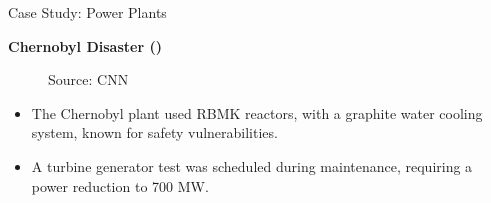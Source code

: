 \documentclass[11pt]{beamer}
\begin{document}
\begin{frame}[t,allowframebreaks]{Case Study: Power Plants}
        \framebreak

        \textbf{Chernobyl Disaster ()}\\[5pt]

        \begin{center}
            \begin{figure}
                \label{fig:chernobyl}
                {\tiny Source: CNN}

            \end{figure}
        \end{center}

        \begin{itemize}
            \item The Chernobyl plant used RBMK reactors, with a graphite water cooling system, known for safety
            vulnerabilities.
            \item A turbine generator test was scheduled during maintenance, requiring a power reduction to 700 MW.
        \end{itemize}


\end{frame}
\end{document}
